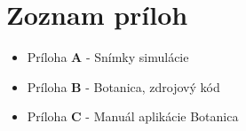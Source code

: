 \documentclass[12pt]{article}
\begin{document}
\section{Zoznam príloh}

\begin{itemize}
	\large
	\item Príloha \textbf{A} - Snímky simulácie
	\item Príloha \textbf{B} - Botanica, zdrojový kód
	\item Príloha \textbf{C} - Manuál aplikácie Botanica
\end{itemize}
\end{document}
